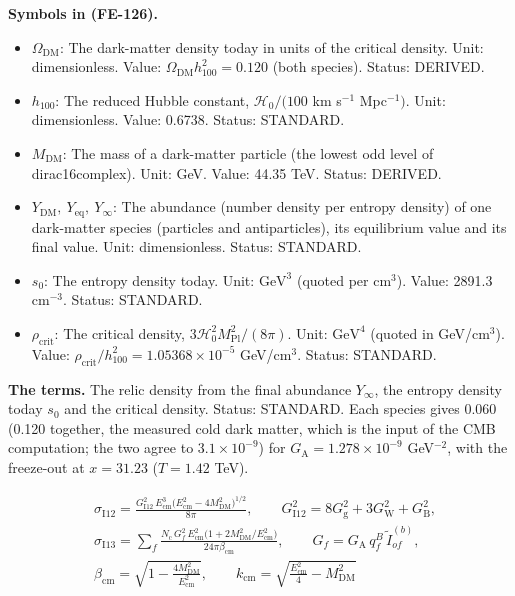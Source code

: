 \documentclass[
  10pt,
]{article}
\providecommand{\tightlist}{%
  \setlength{\itemsep}{0pt}\setlength{\parskip}{0pt}}
\begin{document}
\textbf{Symbols in (FE-126).}

\begin{itemize}
\tightlist
\item
  \(\Omega_{\mathrm{DM}}\): The dark-matter density today in units of
  the critical density. Unit: dimensionless. Value:
  \(\Omega_{\mathrm{DM}}h_{100}^2 = 0.120\) (both species). Status:
  DERIVED.
\item
  \(h_{100}\): The reduced Hubble constant, \(\mathcal{H}_0/(100\) km
  s\(^{-1}\) Mpc\(^{-1})\). Unit: dimensionless. Value: 0.6738. Status:
  STANDARD.
\item
  \(M_{\mathrm{DM}}\): The mass of a dark-matter particle (the lowest
  odd level of dirac16complex). Unit: GeV. Value: 44.35 TeV. Status:
  DERIVED.
\item
  \(Y_{\mathrm{DM}},\ Y_{\mathrm{eq}},\ Y_\infty\): The abundance
  (number density per entropy density) of one dark-matter species
  (particles and antiparticles), its equilibrium value and its final
  value. Unit: dimensionless. Status: STANDARD.
\item
  \(s_0\): The entropy density today. Unit: \(\mathrm{GeV}^{3}\) (quoted
  per \(\mathrm{cm}^{3}\)). Value: 2891.3 cm\(^{-3}\). Status: STANDARD.
\item
  \(\rho_{\mathrm{crit}}\): The critical density,
  \(3\mathcal{H}_0^2M_{\mathrm{Pl}}^2/(8\pi)\). Unit:
  \(\mathrm{GeV}^{4}\) (quoted in GeV/\(\mathrm{cm}^{3}\)). Value:
  \(\rho_{\mathrm{crit}}/h_{100}^2 = 1.05368\times10^{-5}\)
  GeV/cm\(^3\). Status: STANDARD.
\end{itemize}

\textbf{The terms.} The relic density from the final abundance
\(Y_\infty\), the entropy density today \(s_0\) and the critical
density. Status: STANDARD. Each species gives 0.060 (0.120 together, the
measured cold dark matter, which is the input of the CMB computation;
the two agree to \(3.1\times10^{-9}\)) for
\(G_{\mathrm{A}} = 1.278\times10^{-9}\) GeV\(^{-2}\), with the
freeze-out at \(x = 31.23\) (\(T = 1.42\) TeV).

\[
\begin{aligned}
&\sigma_{\mathrm{I12}} = \frac{G_{\mathrm{I12}}^2\,E_{\mathrm{cm}}^3\big(E_{\mathrm{cm}}^2 -
 4M_{\mathrm{DM}}^2\big)^{1/2}}{8\pi},\qquad
 G_{\mathrm{I12}}^2 = 8G_{\mathrm{g}}^2 + 3G_{\mathrm{W}}^2 + G_{\mathrm{B}}^2,\\
&\sigma_{\mathrm{I13}} = \sum_f\frac{N_{\mathrm{c}}\,G_f^2\,E_{\mathrm{cm}}^2\big(1 +
 2M_{\mathrm{DM}}^2/E_{\mathrm{cm}}^2\big)}{24\pi\beta_{\mathrm{cm}}},
 \qquad G_f = G_{\mathrm{A}}\,q^{B}_f\,\tilde I^{(b)}_{of},\\
&\beta_{\mathrm{cm}} = \sqrt{1 - \frac{4M_{\mathrm{DM}}^2}{E_{\mathrm{cm}}^2}},\qquad
 k_{\mathrm{cm}} = \sqrt{\frac{E_{\mathrm{cm}}^2}{4} - M_{\mathrm{DM}}^2}
\end{aligned} \tag{FE-127}
\]
\end{document}

